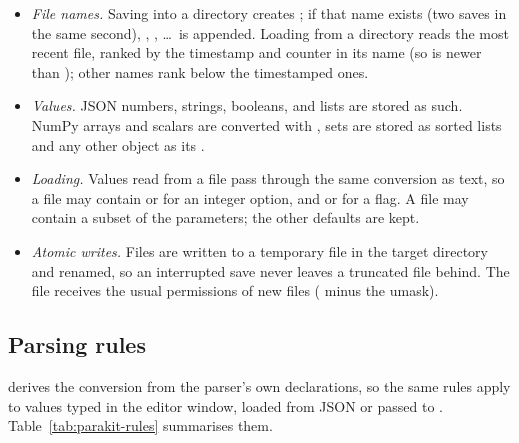 \begin{itemize}
  \item \emph{File names.} Saving into a directory creates
    ; if that name exists (two saves in
    the same second), , , \ldots\ is appended. Loading from
    a directory reads the most recent file, ranked by the timestamp and counter
    in its name (so  is newer than ); other
     names rank below the timestamped ones.
  \item \emph{Values.} JSON numbers, strings, booleans,  and lists
    are stored as such. NumPy arrays and scalars are converted with
    , sets are stored as sorted lists and any other object as its
    .
  \item \emph{Loading.} Values read from a file pass through the same
    conversion as text, so a file may contain  or  for an
    integer option, and  or  for a flag. A file may
    contain a subset of the parameters; the other defaults are kept.
  \item \emph{Atomic writes.} Files are written to a temporary file in the
    target directory and renamed, so an interrupted save never leaves a
    truncated file behind. The file receives the usual permissions of new files
    ( minus the umask).
\end{itemize}

\subsection{Parsing rules}\label{sec:parakit-parsing}

 derives the conversion from the parser's
own declarations, so the same rules apply to values typed in the editor
window, loaded from JSON or passed to .
Table~\ref{tab:parakit-rules} summarises them.

